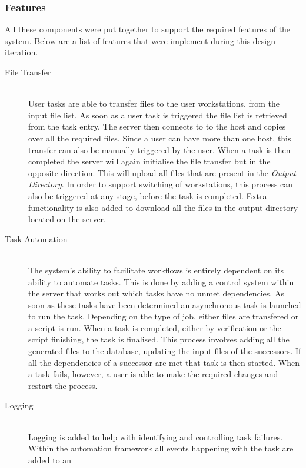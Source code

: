 \documentclass[12pt,a4paper]{report}
\begin{document}
\subsubsection{Features}
All these components were put together to support the required features of the system. Below
are a list of features that were implement during this design iteration.
\begin{description}
    \item[File Transfer] \hfill \\
        User tasks are able to transfer files to the user workstations, from the input
        file list. As soon as a user task is triggered the file list is retrieved
        from the task entry. The server then connects to to the host and copies over all
        the required files. Since a user can have more than one host, this transfer can also
        be manually triggered by the user. When a task is then completed the server will
        again initialise the file transfer but in the opposite direction. This
	will upload all files that are present in the \emph{Output Directory}. In order
	to support switching of workstations,
        this process can also be triggered at any stage, before the task is completed.
        Extra functionality is also added to download all the files in the output directory
        located on the server.
    \item[Task Automation] \hfill \\
        The system's ability to facilitate workflows is entirely dependent on its ability
        to automate tasks. This is done by adding a control system within the server
        that works out which tasks have no unmet dependencies. As soon as these tasks
        have been determined an asynchronous task is launched to run the task. Depending on
        the type of job, either files are transfered or a script is run. When a task is
        completed, either by verification or the script finishing, the task is finalised.
        This process involves adding all the generated files to the database, updating the
        input files of the successors. If all the dependencies of a successor
	are met that task is then started. When a task fails, however, a user is able to
	make the required changes and restart the process.
    \item[Logging] \hfill \\
        Logging is added to help with identifying and controlling task failures. Within
        the automation framework all events happening with the task are added to an

\end{description}
\end{document}

